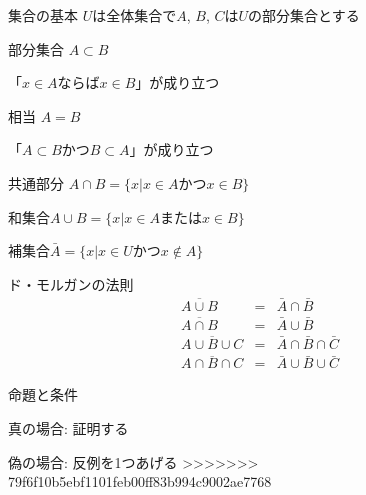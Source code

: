 \documentclass[aspectratio=169, 12pt]{beamer} %
\begin{document}
\begin{frame}{集合の基本}
    $U$は全体集合で$A$, $B$, $C$は$U$の部分集合とする \par
    部分集合 $A\subset B$ \par
    \begin{center}
        「$x \in A$ならば$x\in B$」が成り立つ\par
    \end{center}
    相当 $A=B$ \par
    \begin{center}
        「$A\subset B$かつ$B\subset A$」が成り立つ \par
    \end{center}

    共通部分 $A\cap B = \{x|x\in A かつ x \in B\}$ \par
    和集合\space\space\space\space $A\cup B = \{x|x\in A または x \in B \}$ \par
    補集合\space\space\space\space\space\space\space\space\space\space $\bar{A}=\{x|x\in U かつ x\notin A\}$
\end{frame}
\begin{frame}{ド・モルガンの法則}
    \begin{eqnarray*}
        \overline{A\cup B}&=&\bar{A}\cap \bar{B} \\
        \overline{A\cap B}&=&\bar{A}\cup \bar{B} \\
        \overline{A\cup B\cup C}&=&\bar{A}\cap\bar{B}\cap\bar{C} \\
        \overline{A\cap B\cap C}&=&\bar{A}\cup\bar{B}\cup\bar{C}
    \end{eqnarray*}
\end{frame}
\begin{frame}{命題と条件}
    \begin{center}
        真の場合: 証明する \par
        偽の場合: 反例を1つあげる
>>>>>>> 79f6f10b5ebf1101feb00ff83b994c9002ae7768
    \end{center}
\end{frame}
\end{document}
